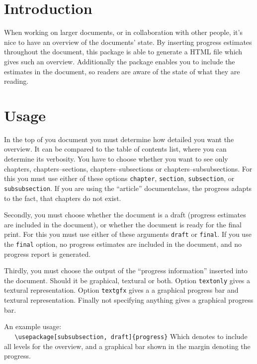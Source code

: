 \documentclass{article}
\begin{document}
\section{Introduction}
When working on larger documents, or in collaboration with other people, it's nice to have an overview of the documents' state.  By inserting progress estimates throughout the document, this package is able to generate a HTML file which gives such an overview. Additionally the package enables you to include the estimates in the document, so   readers are aware of the state of what they are reading.


\section{Usage}
In the top of you document you must determine how detailed you want the overview. It can be compared to the table of contents list, where you can determine its verbosity. You have to choose whether you want to see only chapters, chapters--sections, chapters--subsections or chapters--subsubsections. For this you must use either of these options \texttt{chapter}, \texttt{section}, \texttt{subsection}, or \texttt{subsubsection}. If you are using the ``article'' documentclass, the progress adapts to the fact, that chapters do not exist.

Secondly, you must choose whether the document is a draft (progress estimates are included in the document), or whether the document is ready for the final print. For this you must use either of these arguments \texttt{draft} or \texttt{final}. If  you use the \texttt{final} option, no progress estimates are included in the document, and no progress report is generated.

Thirdly, you must choose the output of the ``progress information'' inserted into the document. Should it be graphical, textural or both.  Option  \texttt{textonly} gives a textural representation. Option  \texttt{textgfx} gives a a graphical progress bar and textural representation. Finally not specifying anything gives a graphical progress bar.

\bigskip
An example usage:\\
\verb|   \usepackage[subsubsection, draft]{progress}|
\vskip 0.3cm
Which denotes to include all levels for the overview, and a graphical bar shown in the margin denoting the progress.
\end{document}
